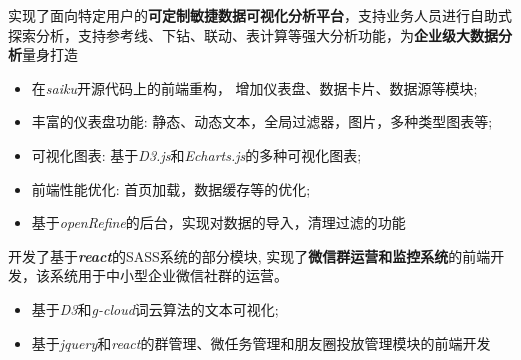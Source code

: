 \documentclass{resume}
\begin{document}
\begin{onehalfspacing}
实现了面向特定用户的\textbf{可定制敏捷数据可视化分析平台}，支持业务人员进行自助式探索分析，支持参考线、下钻、联动、表计算等强大分析功能，为\textbf{企业级大数据分析}量身打造
\begin{itemize}
  \item 在\textit{saiku}开源代码上的前端重构， 增加仪表盘、数据卡片、数据源等模块;
  \item 丰富的仪表盘功能: 静态、动态文本，全局过滤器，图片，多种类型图表等;
  \item 可视化图表: 基于\textit{D3.js}和\textit{Echarts.js}的多种可视化图表;
  \item 前端性能优化: 首页加载，数据缓存等的优化;
  \item 基于\textit{openRefine}的后台，实现对数据的导入，清理过滤的功能
\end{itemize}
\end{onehalfspacing}

\begin{onehalfspacing}
开发了基于\textit{\textbf{react}}的SASS系统的部分模块, 实现了\textbf{微信群运营和监控系统}的前端开发，该系统用于中小型企业微信社群的运营。

\begin{itemize}
  \item 基于\textit{D3}和\textit{g-cloud}词云算法的文本可视化;
  \item 基于\textit{jquery}和\textit{react}的群管理、微任务管理和朋友圈投放管理模块的前端开发
\end{itemize}
\end{onehalfspacing}

\end{document}
